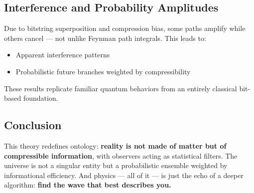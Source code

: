 \documentclass[11pt]{article}
\begin{document}
\subsection*{Interference and Probability Amplitudes}

Due to bitstring superposition and compression bias, some paths amplify while others cancel — not unlike Feynman path integrals. This leads to:

\begin{itemize}
      \item Apparent interference patterns
      \item Probabilistic future branches weighted by compressibility
\end{itemize}

These results replicate familiar quantum behaviors from an entirely classical bit-based foundation.



\subsection*{Conclusion}

This theory redefines ontology: \textbf{reality is not made of matter but of compressible information}, with observers acting as statistical filters. The universe is not a singular entity but a probabilistic ensemble weighted by informational efficiency. And physics — all of it — is just the echo of a deeper algorithm: \textbf{find the wave that best describes you.}
\end{document}
